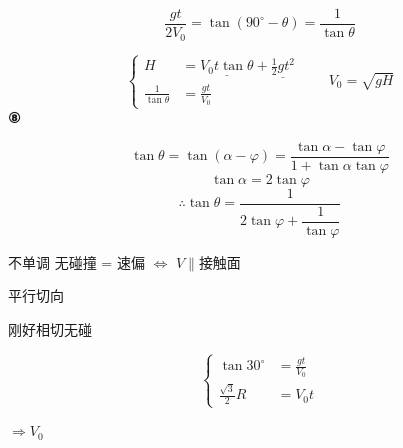 \[
\frac{gt}{2V_0}=\tan(90^\circ-\theta)=\frac{1}{\tan\theta}
\]

\[
\left\{\begin{aligned}
H&=\underline{V_0t\tan\theta}+\underline{\tfrac12gt^2}\\
\frac{1}{\tan\theta}&=\frac{gt}{V_0}
\end{aligned}\right.
\qquad V_0=\sqrt{gH}
\]%
\textbf{⑧}

\[
\tan\theta=\tan(\alpha-\varphi)=\frac{\tan\alpha-\tan\varphi}{1+\tan\alpha\tan\varphi}
\]
\[
\tan\alpha=2\tan\varphi
\]
\[
\therefore\tan\theta=\frac{1}{2\tan\varphi+\dfrac{1}{\tan\varphi}}
\]

\noindent 不单调
\noindent 无碰撞 = 速偏 $\Leftrightarrow$ $V\parallel$接触面%

\noindent 平行\qquad 切向

\noindent 刚好相切无碰

\[
\left\{\begin{aligned}
\tan30^\circ&=\frac{gt}{V_0}\\
\frac{\sqrt3}{2}R&=V_0t
\end{aligned}\right.
\]%

\noindent {}%

\noindent $\Rightarrow V_0$
